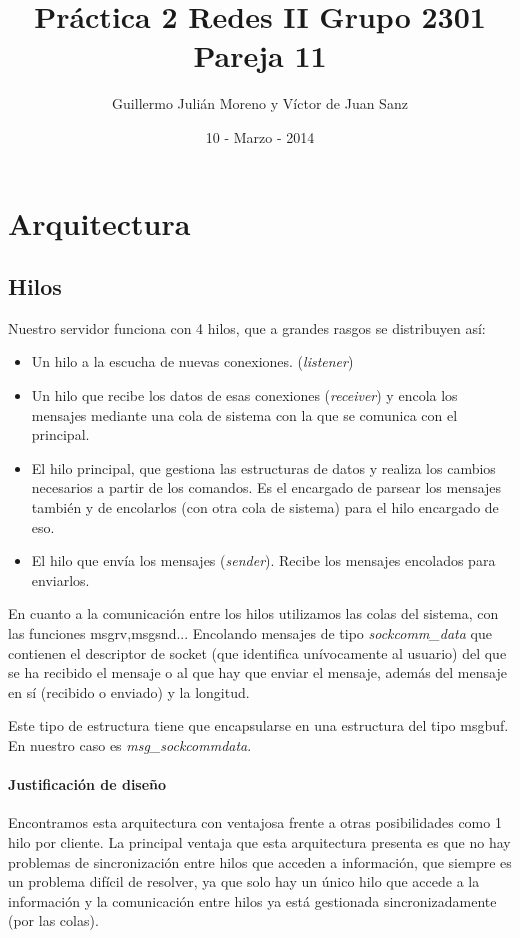 \documentclass[nochap]{apuntes}
\title{Práctica 2 Redes II Grupo 2301 Pareja 11}
\author{ Guillermo Julián Moreno  y Víctor de Juan Sanz}
\date{10 - Marzo - 2014}
\begin{document}
\maketitle
\newpage
\tableofcontents
\newpage

\section{Arquitectura}

\subsection{Hilos}
Nuestro servidor funciona con 4 hilos, que a grandes rasgos se distribuyen así:
\begin{itemize}
\item  Un hilo a la escucha de nuevas conexiones. (\emph{listener})
\item Un hilo que recibe los datos de esas conexiones (\emph{receiver}) y encola los mensajes mediante una cola de sistema con la que se comunica con el principal.
\item El hilo principal, que gestiona las estructuras de datos y realiza los cambios necesarios a partir de los comandos. Es el encargado de parsear los mensajes también y de encolarlos (con otra cola de sistema) para el hilo encargado de eso.
\item El hilo que envía los mensajes (\emph{sender}). Recibe los mensajes encolados para enviarlos.
\end{itemize}

En cuanto a la comunicación entre los hilos utilizamos las colas del sistema, con las funciones msgrv,msgsnd... Encolando mensajes de tipo \textit{sockcomm\_data} que contienen el descriptor de socket (que identifica unívocamente al usuario) del que se ha recibido el mensaje o al que hay que enviar el mensaje, además del mensaje en sí (recibido o enviado) y la longitud. 

Este tipo de estructura tiene que encapsularse en una estructura del tipo msgbuf. En nuestro caso es \textit{msg\_sockcommdata}.

\paragraph{Justificación de diseño}

Encontramos esta arquitectura con ventajosa frente a otras posibilidades como 1 hilo por cliente. La principal ventaja que esta arquitectura presenta es que no hay problemas de sincronización entre hilos que acceden a información, que siempre es un problema difícil de resolver, ya que solo hay un único hilo que accede a la información y la comunicación entre hilos ya está gestionada sincronizadamente (por las colas).
\end{document}
